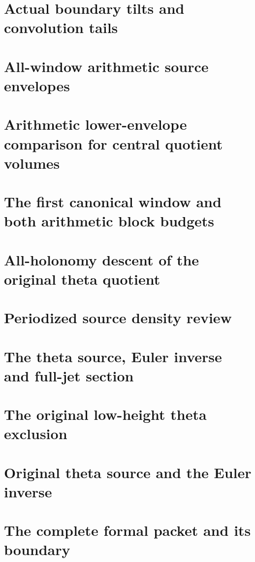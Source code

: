 \documentclass[11pt,a4paper,oneside,openany]{book}
\theoremstyle{definition}
\begin{document}
\chapter{Actual boundary tilts and convolution tails}
\begingroup

\endgroup
\chapter{All-window arithmetic source envelopes}
\begingroup

\endgroup
\chapter{Arithmetic lower-envelope comparison for central quotient volumes}
\begingroup

\endgroup
\chapter{The first canonical window and both arithmetic block budgets}
\begingroup

\endgroup
\chapter{All-holonomy descent of the original theta quotient}
\begingroup

\endgroup
\chapter{Periodized source density review}
\begingroup

\endgroup
\chapter{The theta source, Euler inverse and full-jet section}
\begingroup

\endgroup
\chapter{The original low-height theta exclusion}
\begingroup

\endgroup
\chapter{Original theta source and the Euler inverse}
\begingroup

\endgroup
\chapter{The complete formal packet and its boundary}
\begingroup

\endgroup
\end{document}
